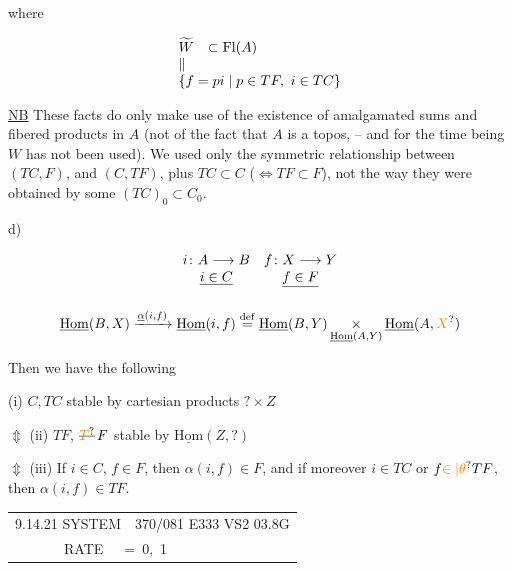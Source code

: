 where

\[
\begin{array}{ll}
\widetilde W&\subset\mathrm{Fl}(A)\\
\Vert&\\
\multicolumn{2}{l}{\{f=pi\mid p\in TF,\ i\in TC\}}
\end{array}
\]

\uline{NB} These facts do only make use of the existence of  amalgamated sums and fibered products in $A$ (not of the fact that $A$ is a topos, -- and for the time being $W$ has not been used). We used only the symmetric relationship between  $(TC,F)$, and $(C,TF)$,  plus $TC\subset C$ ($\Longleftrightarrow TF\subset F$), not the way they were obtained by some  $(TC)_0\subset C_0$.

d)  

\[
\begin{array}{cc}
i\colon A\longrightarrow B&f\colon X\longrightarrow Y\\
\deleted{i\in C}&\deleted{f\in F}
\end{array}
\]


\[
\underline{\mathrm{Hom}}(B,X)\xrightarrow{\underline{\alpha}(i,f)}
\underline{\mathrm{Hom}}(i,f)\overset{\mathrm{def}}=
\underline{\mathrm{Hom}}(B,Y)\mathop{\times}_{\underline{\mathrm{Hom}}(A,Y)}\underline{\mathrm{Hom}}(A,\unsure{X})
\]

 Then we have the following 

(i) $C,TC$ stable by cartesian products $? \times Z$

$\Updownarrow$ (ii) $TF$, $\deleted{\unsure{T}}\,F$ stable by $\underline{\mathrm{Hom}}(Z,?)$

$\Updownarrow$ (iii) If $i\in C$, $f\in F$, then $\alpha(i,f)\in F$, and if moreover $i\in TC$ or $f\unsure{\in|\theta}TF$, then $\alpha(i,f)\in TF$.



{\scriptsize\ttfamily\begin{tabular}{@{}l@{}}
9.14.21 \qquad SYSTEM~~370/081 E333 \quad VS2 03.8G\\
~~~~~~~RATE~~~=~0,~1
\end{tabular}}


